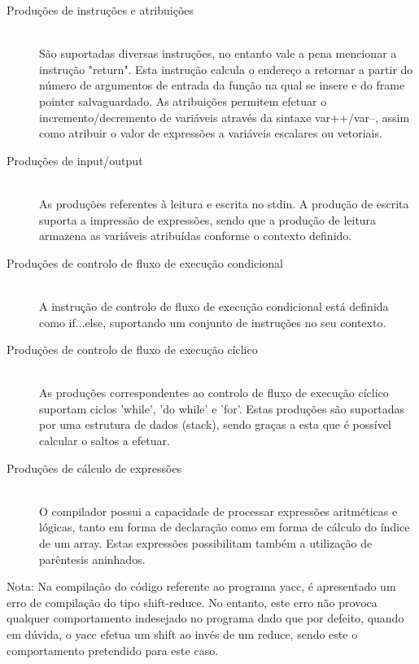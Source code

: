 \documentclass[a4paper,10pt]{report}
\begin{document}
\begin{description}
\item[Produções de instruções e atribuições] \hfill \\

São suportadas diversas instruções, no entanto vale a pena mencionar a instrução "return". Esta instrução calcula o endereço a retornar a partir do número de argumentos de entrada da função na qual se insere e do frame pointer salvaguardado. As atribuições permitem efetuar o incremento/decremento de variáveis através da sintaxe var++/var--, assim como atribuir o valor de expressões a variáveis escalares ou vetoriais. 
\item[Produções de input/output] \hfill \\

As produções referentes à leitura e escrita no stdin. A produção de escrita suporta a impressão de expressões, sendo que a produção de leitura armazena as variáveis atribuídas conforme o contexto definido. 

\item[Produções de controlo de fluxo de execução condicional] \hfill \\

A instrução de controlo de fluxo de execução condicional está definida como if...else, suportando um conjunto de instruções no seu contexto.

\item[Produções de controlo de fluxo de execução cíclico] \hfill \\

As produções correspondentes ao controlo de fluxo de execução cíclico suportam ciclos 'while', 'do while' e 'for'. Estas produções são suportadas por uma estrutura de dados (stack), sendo graças a esta que é possível calcular o saltos a efetuar.

\item[Produções de cálculo de expressões] \hfill \\

O compilador possui a capacidade de processar expressões aritméticas e lógicas, tanto em forma de declaração como em forma de cálculo do índice de um array. Estas expressões possibilitam também a utilização de parêntesis aninhados.

\end{description}

Nota: Na compilação do código referente ao programa yacc, é apresentado um erro de compilação do tipo shift-reduce. No entanto, este erro não provoca qualquer comportamento indesejado no programa dado que por defeito, quando em dúvida, o yacc efetua um shift ao invés de um reduce, sendo este o comportamento pretendido para este caso.
\end{document}

